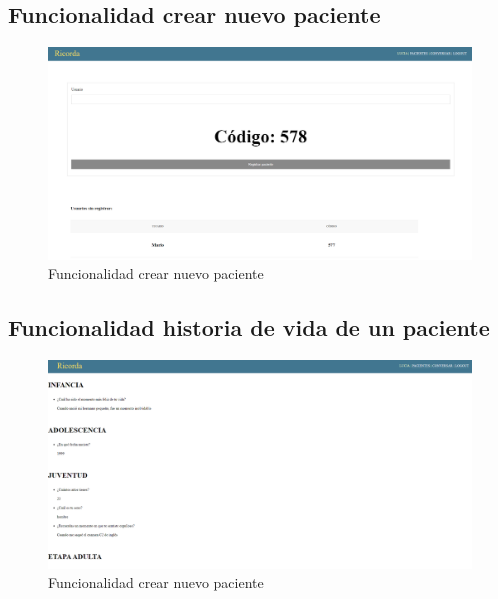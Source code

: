 \subsection{Funcionalidad crear nuevo paciente}
\begin{figure}[h]
	\centering
	\includegraphics[scale=0.3]{Imagenes/Vectorial/funcionalidad_nuevo_paciente}
	\caption{Funcionalidad crear nuevo paciente}
	\label{fig:funcionalidadnuevopaciente}
\end{figure}

\subsection{Funcionalidad historia de vida de un paciente}
 

\begin{figure}[h]
	\centering
	\includegraphics[scale=0.3]{Imagenes/Vectorial/funcionalidad_historia_vida}
	\caption{Funcionalidad crear nuevo paciente}
	\label{fig:funcionalidadhistoriavida}
\end{figure}




